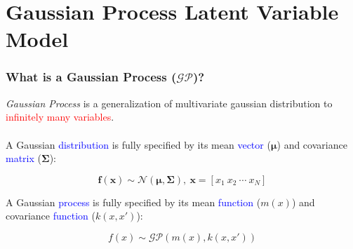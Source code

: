 \documentclass[10pt,handout]{beamer}
\begin{document}

\section[GP-LVM]{Gaussian Process Latent Variable Model}

\begin{frame}
\frametitle{What is a Gaussian Process ($\mathcal{GP}$)?}

\emph{Gaussian Process} is a generalization of multivariate gaussian distribution to \textcolor{red}{infinitely many variables}.\\~\\

A Gaussian \textcolor{blue}{distribution} is fully specified by its mean \textcolor{blue}{vector} ($\boldsymbol{\mu}$) and covariance \textcolor{blue}{matrix} ($\boldsymbol{\Sigma}$):

\begin{equation}
  \mathbf{f}(\mathbf{x}) \sim \mathcal{N}(\boldsymbol{\mu},\boldsymbol{\Sigma}),~\mathbf{x} = [x_1~x_2~\cdots~x_N]
\end{equation}

A Gaussian \textcolor{blue}{process} is fully specified by its mean \textcolor{blue}{function} ($m(x)$) and covariance \textcolor{blue}{function} ($k(x,x')$):

\begin{equation}
  f(x) \sim \mathcal{GP}(m(x), k(x,x'))
\end{equation}

\end{frame}
\end{document}
